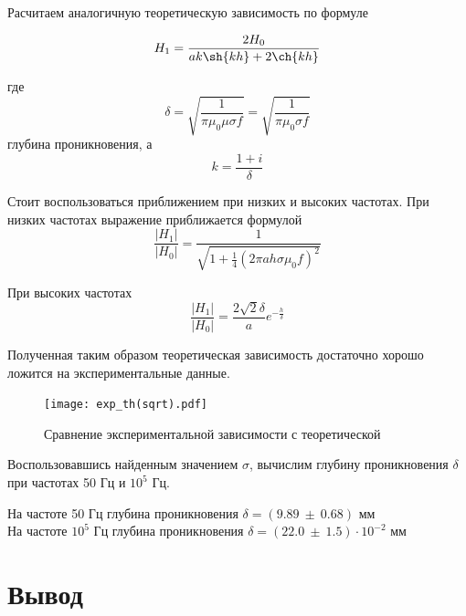     Расчитаем аналогичную теоретическую зависимость по формуле

    \begin{equation}
        H_{1} = \frac{2 H_0}{a k \sh{k h} + 2 \ch{k h}}
    \end{equation}

    где
    \begin{equation}
        \delta = \sqrt{\frac{1}{\pi \mu_0 \mu \sigma f}} = \sqrt{\frac{1}{\pi \mu_0 \sigma f}}
    \end{equation}
    глубина проникновения, а
    \begin{equation}
       k = \frac{1 + i}{\delta} 
    \end{equation}

    Стоит воспользоваться приближением при низких и высоких частотах. 
    При низких частотах выражение приближается формулой 
    \begin{equation}
        \frac{|H_1|}{|H_0|} = \frac{1}{\sqrt{1 + \frac{1}{4} (2 \pi a h \sigma \mu_0 f)^2}}
    \end{equation}

    При высоких частотах 
    \begin{equation}
        \frac{|H_1|}{|H_0|} = \frac{2 \sqrt{2} \delta}{a} e^{-\frac{h}{\delta}}
    \end{equation}

    Полученная таким образом теоретическая зависимость достаточно хорошо ложится на экспериментальные данные.

    \begin{figure}
        \centering
        \texttt{[image: exp\_th(sqrt).pdf]}
        \caption{Сравнение экспериментальной зависимости с теоретической}
        \label{exp_th(sqrt)}
    \end{figure}

    Воспользовавшись найденным значением $\sigma$, вычислим глубину проникновения $\delta$ при частотах 50 Гц и $10^5$ Гц.

    \begin{center}
        На частоте 50 Гц глубина проникновения $\delta = (9.89 ~ \pm ~ 0.68)$ мм \\
        На частоте $10^5$ Гц глубина проникновения $\delta = (22.0 ~ \pm ~ 1.5) \cdot 10^{-2}$ мм
    \end{center}

	\section*{Вывод}

